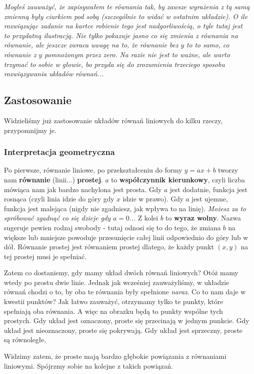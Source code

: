 \documentclass{article}
\theoremstyle{remark}
\begin{document}
\textit{Mogłeś zauważyć, że zapisywałem te równania tak, by zawsze wyrażenia z tą samą zmienną
były ciurkiem pod sobą (szczególnie to widać w ostatnim układzie). O ile rozwiązując
zadanie na kartce robienie tego jest nadgorliwością, o tyle tutaj jest to przydatną
ilustracją. Nie tylko pokazuje jasno co się zmienia z równania na równanie, ale jeszcze
zwraca uwagę na to, że równanie bez $y$ to to samo, co równanie z $y$ pomnożonym
przez zero. Na razie nie jest to ważne, ale warto trzymać to sobie w głowie, bo
przyda się do zrozumienia trzeciego sposobu rozwiązywania układów równań...}

\subsection{Zastosowanie}
Widzieliśmy już zastosowanie układów równań liniowych do kilku rzeczy, przypomnijmy je.

\subsubsection{Interpretacja geometryczna}
Po pierwsze, równanie liniowe, po przekształceniu do formy $y=ax+b$ tworzy
nam \textbf{równanie} (linii...) \textbf{prostej}. $a$ to \textbf{współczynnik kierunkowy}, czyli
liczba mówiąca nam jak bardzo nachylona jest prosta. Gdy $a$ jest dodatnie, funkcja jest
rosnąca (czyli linia idzie do góry gdy $x$ idzie w prawo). Gdy $a$ jest ujemne,
funkcja jest malejąca (nigdy nie zgadniesz, jak wpływa to na linię). \textit{Możesz
za to spróbować zgadnąć co się dzieje gdy $a=0$...} Z kolei $b$ to \textbf{wyraz wolny}.
Nazwa sugeruje pewien rodzaj swobody - tutaj odnosi się to do tego, że zmiana $b$ na
większe lub mniejsze powoduje przesunięcie całej linii odpowiednio do góry lub w dół.
Równanie prostej jest równaniem prostej dlatego, że każdy punkt $(x, y)$ na tej prostej
musi je spełniać.

Zatem co dostaniemy, gdy mamy układ dwóch równań liniowych? Otóż mamy wtedy po prostu dwie
linie. Jednak jak wcześniej zauważyliśmy, w układzie równań chodzi o to, by oba te
równania były spełnione \textit{naraz}. Co to nam daje w kwestii punktów? Jak łatwo
zauważyć, otrzymamy tylko te punkty, które spełniają oba równania. A więc na obrazku
będą to punkty wspólne tych prostych.
\subitem Gdy układ jest oznaczony, proste się przecinają w jednym punkcie.
\subitem Gdy układ jest nieoznaczony, proste się pokrywają.
\subitem Gdy układ jest sprzeczny, proste są równoległe.


Widzimy zatem, że proste mają bardzo głębokie powiązania z równaniami liniowymi.
Spójrzmy sobie na kolejne z takich powiązań.
\end{document}
